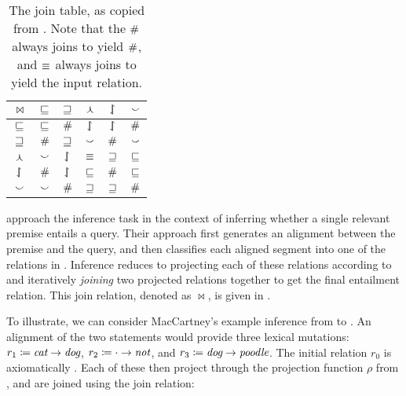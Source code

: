 %
%

\begin{table}[t]
	\begin{center}
	\begin{tabular}{|c||c|c|c|c|c|}
    \hline
    $\bowtie$ & $\sqsubseteq$ & $\sqsupseteq$ & $\curlywedge$ & $\downharpoonleft\hspace{-1.25mm}\upharpoonright$ & $\smallsmile$ \\
    \hline
    $\sqsubseteq$ & $\sqsubseteq$ & $\#$ & $\downharpoonleft\hspace{-1.25mm}\upharpoonright$ & $\downharpoonleft\hspace{-1.25mm}\upharpoonright$ & $\#$ \\
    $\sqsupseteq$ & $\#$ & $\sqsupseteq$ & $\smallsmile$ & $\#$ & $\smallsmile$ \\
    $\curlywedge$ & $\smallsmile$ & $\downharpoonleft\hspace{-1.25mm}\upharpoonright$ & $\equiv$ & $\sqsupseteq$ & $\sqsubseteq$ \\
    $\downharpoonleft\hspace{-1.25mm}\upharpoonright$ & $\#$ & $\downharpoonleft\hspace{-1.25mm}\upharpoonright$ & $\sqsubseteq$ & $\#$ & $\sqsubseteq$ \\
    $\smallsmile$ & $\smallsmile$ & $\#$ & $\sqsupseteq$ & $\sqsupseteq$ & $\#$ \\
    \hline
	\end{tabular}
	\caption{
    The join table, as copied from .
    Note that the $\#$ always joins to yield $\#$,
    and $\equiv$ always joins to yield the input relation.
		\label{tab:join}
	}
	\end{center}
\end{table}

 approach the inference task in
  the context of inferring whether a single relevant premise entails
  a query.
Their approach first generates an alignment between the premise
  and the query, and then classifies each aligned segment into one of
  the relations in .
Inference reduces to projecting each of these relations
  according to  and iteratively \textit{joining} 
  two projected relations together to get the final entailment
  relation.
This join relation, denoted as $\bowtie$, 
  is given in .

To illustrate, we can consider MacCartney's example inference from
   to .
An alignment of the two statements would provide three lexical
  mutations:
    \mbox{$r_1\coloneqq\textit{cat}\rightarrow\textit{dog}$}, 
    \mbox{$r_2\coloneqq\cdot\rightarrow\textit{not}$},
    and \mbox{$r_3\coloneqq\textit{dog}\rightarrow\textit{poodle}$}.
The initial relation $r_0$ is axiomatically \equivalent.
Each of these then project through the projection function $\rho$
  from ,
  and are joined using the join relation:

